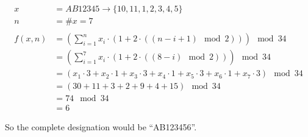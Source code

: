 \begin{align*}
	x &= AB12345 \rightarrow \{10, 11, 1, 2, 3, 4, 5\} \\
	n &= \#x = 7 \\
	\\
	f(x, n) &= \left(\sum_{i=1}^{n} x_i \cdot \left(1 + 2 \cdot \left( \left(
		n - i + 1 \right) \mod 2 \right) \right) \right) \mod 34 \\
		&= \left(\sum_{i=1}^{7} x_i \cdot \left(1 + 2 \cdot \left( \left(
			8 - i \right) \mod 2 \right) \right) \right) \mod 34 \\
		&= \left(
			x_1 \cdot 3 + x_2 \cdot 1 + x_3 \cdot 3 + x_4 \cdot 1 +
			x_5 \cdot 3 + x_6 \cdot 1 + x_7 \cdot 3
			\right) \mod 34 \\
		&= \left( 30 + 11 + 3 + 2 + 9 + 4 + 15 \right) \mod 34 \\
		&= 74 \mod 34 \\
		&= 6
\end{align*}

So the complete designation would be ``AB123456''.
